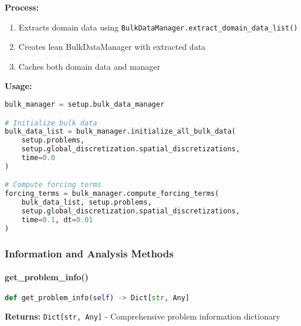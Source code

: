 \textbf{Process:}
\begin{enumerate}
    \item Extracts domain data using \texttt{BulkDataManager.extract\_domain\_data\_list()}
    \item Creates lean BulkDataManager with extracted data
    \item Caches both domain data and manager
\end{enumerate}

\textbf{Usage:}
\begin{lstlisting}[language=Python, caption=Bulk Data Manager Usage]
bulk_manager = setup.bulk_data_manager

# Initialize bulk data
bulk_data_list = bulk_manager.initialize_all_bulk_data(
    setup.problems,
    setup.global_discretization.spatial_discretizations,
    time=0.0
)

# Compute forcing terms
forcing_terms = bulk_manager.compute_forcing_terms(
    bulk_data_list, setup.problems,
    setup.global_discretization.spatial_discretizations,
    time=0.1, dt=0.01
)
\end{lstlisting}

\subsubsection{Information and Analysis Methods}

\paragraph{get\_problem\_info()}
\begin{lstlisting}[language=Python, caption=Get Problem Info Method]
def get_problem_info(self) -> Dict[str, Any]
\end{lstlisting}

\textbf{Returns:} \texttt{Dict[str, Any]} - Comprehensive problem information dictionary

